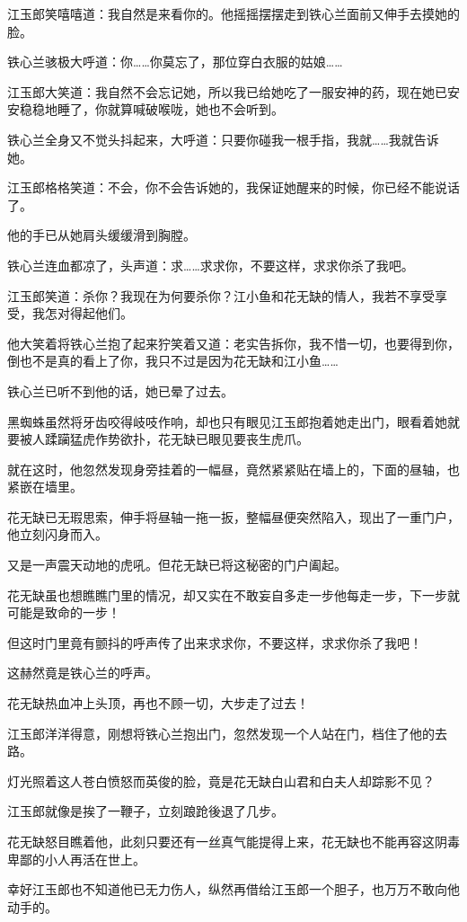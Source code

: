\documentclass[12pt,oneside]{book}
\begin{document}
江玉郎笑嘻嘻道：我自然是来看你的。他摇摇摆摆走到铁心兰面前又伸手去摸她的脸。

铁心兰骇极大呼道：你\ldots\ldots 你莫忘了，那位穿白衣服的姑娘\ldots\ldots{}

江玉郎大笑道：我自然不会忘记她，所以我已给她吃了一服安神的药，现在她已安安稳稳地睡了，你就算喊破喉咙，她也不会听到。

铁心兰全身又不觉头抖起来，大呼道：只要你碰我一根手指，我就\ldots\ldots 我就告诉她。

江玉郎格格笑道：不会，你不会告诉她的，我保证她醒来的时候，你已经不能说话了。

他的手已从她肩头缓缓滑到胸膛。

铁心兰连血都凉了，头声道：求\ldots\ldots 求求你，不要这样，求求你杀了我吧。

江玉郎笑道：杀你？我现在为何要杀你？江小鱼和花无缺的情人，我若不享受享受，我怎对得起他们。

他大笑着将铁心兰抱了起来狞笑着又道：老实告拆你，我不惜一切，也要得到你，倒也不是真的看上了你，我只不过是因为花无缺和江小鱼\ldots\ldots{}

铁心兰已听不到他的话，她已晕了过去。

黑蜘蛛虽然将牙齿咬得岐吱作响，却也只有眼见江玉郎抱着她走出门，眼看着她就要被人蹂躏猛虎作势欲扑，花无缺已眼见要丧生虎爪。

就在这时，他忽然发现身旁挂着的一幅昼，竟然紧紧贴在墙上的，下面的昼轴，也紧嵌在墙里。

花无缺已无瑕思索，伸手将昼轴一拖一扳，整幅昼便突然陷入，现出了一重门户，他立刻闪身而入。

又是一声震天动地的虎吼。但花无缺已将这秘密的门户阖起。

花无缺虽也想瞧瞧门里的情况，却又实在不敢妄自多走一步他每走一步，下一步就可能是致命的一步！

但这时门里竟有颤抖的呼声传了出来求求你，不要这样，求求你杀了我吧！

这赫然竟是铁心兰的呼声。

花无缺热血冲上头顶，再也不顾一切，大步走了过去！

江玉郎洋洋得意，刚想将铁心兰抱出门，忽然发现一个人站在门，档住了他的去路。

灯光照着这人苍白愤怒而英俊的脸，竟是花无缺白山君和白夫人却踪影不见？

江玉郎就像是挨了一鞭子，立刻踉跄後退了几步。

花无缺怒目瞧着他，此刻只要还有一丝真气能提得上来，花无缺也不能再容这阴毒卑鄙的小人再活在世上。

幸好江玉郎也不知道他已无力伤人，纵然再借给江玉郎一个胆子，也万万不敢向他动手的。
\end{document}
